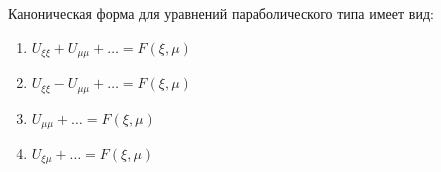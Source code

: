 Каноническая форма для уравнений параболического типа имеет вид:

\begin{enumerate}[label=\arabic*)]
    \item \(U_{\xi \xi }+U_{\mu \mu }+\dots =F\left(\xi ,\mu \right)\)
    \item \(U_{\xi \xi }-U_{\mu \mu }+\dots =F\left(\xi ,\mu \right)\)
    \item \(U_{\mu \mu }+\dots =F\left(\xi ,\mu \right)\)
    \item \(U_{\xi \mu }+\dots =F\left(\xi ,\mu \right)\)
\end{enumerate}

